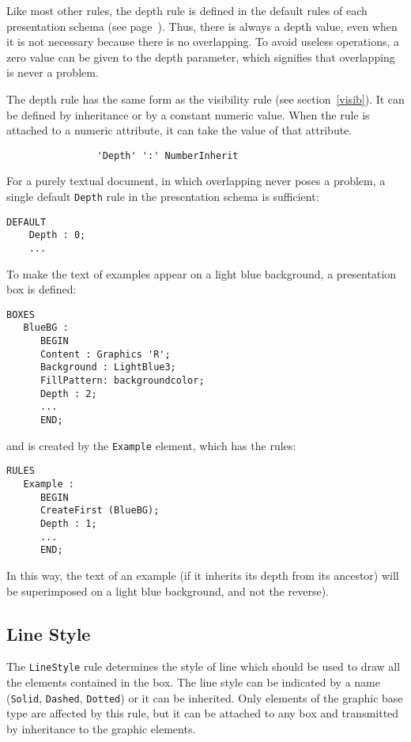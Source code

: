 Like most other rules, the depth rule is defined in the default rules
of each presentation schema (see page~\pageref{reglesdefaut}).  Thus,
there is always a depth value, even when it is not necessary because
there is no overlapping.  To avoid useless operations, a zero value
can be given to the depth parameter, which signifies that overlapping
is never a problem.

The depth rule has the same form as the visibility rule (see
section~\ref{visib}).  It can be defined by inheritance or by a
constant numeric value.  When the rule is attached to a numeric
attribute, it can take the value of that attribute.

\begin{verbatim}
                'Depth' ':' NumberInherit
\end{verbatim}

\begin{example}
For a purely textual document, in which overlapping never poses a
problem, a single default {\tt Depth} rule in the presentation schema
is sufficient:
\begin{verbatim}
DEFAULT
    Depth : 0;
    ...
\end{verbatim}

To make the text of examples appear on a light blue background, a
presentation box is defined:
\begin{verbatim}
BOXES
   BlueBG :
      BEGIN
      Content : Graphics 'R';
      Background : LightBlue3;
      FillPattern: backgroundcolor;
      Depth : 2;
      ...
      END;
\end{verbatim}
and is created by the {\tt Example} element, which has the rules:
\begin{verbatim}
RULES
   Example :
      BEGIN
      CreateFirst (BlueBG);
      Depth : 1;
      ...
      END;
\end{verbatim}
In this way, the text of an example (if it inherits its depth from its
ancestor) will be superimposed on a light blue background, and not the
reverse).
\end{example}

\subsection{Line Style}
\label{styletrait}

The {\tt LineStyle} rule determines the style of line which should be
used to draw all the elements contained in the box.  The line style
can be indicated by a name ({\tt Solid}, {\tt Dashed}, {\tt Dotted})
or it can be inherited.  Only elements of the graphic base type are
affected by this rule, but it can be attached to any box and
transmitted by inheritance to the graphic elements.

